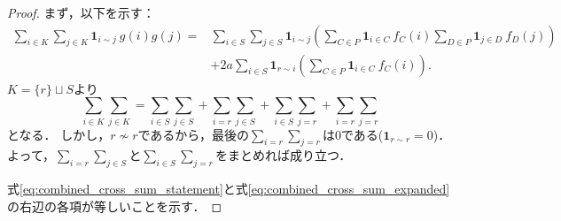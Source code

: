 \begin{proof}
  まず，以下を示す：
  \begin{equation} \label{eq:combined_cross_sum_expanded}
    \begin{split}
      \sum_{i \in K} \sum_{j \in K} \bm{1}_{i \sim j}\ g(i) g(j)
      = &\sum_{i \in S} \sum_{j \in S} \bm{1}_{i \sim j} \left( \sum_{C \in P} \bm{1}_{i \in C}\ f_C(i) \sum_{D \in P} \bm{1}_{j \in D}\ f_D(j) \right) \\
        &+ 2 a \sum_{i \in S} \bm{1}_{r \sim i} \left( \sum_{C \in P} \bm{1}_{i \in C}\ f_C(i) \right).
    \end{split}
  \end{equation}
  $K = \{r\} \sqcup S$より
  \begin{equation}
    \sum_{i \in K} \sum_{j \in K}
    = \sum_{i \in S} \sum_{j \in S} + \sum_{i = r} \sum_{j \in S} + \sum_{i \in S} \sum_{j = r} + \sum_{i = r} \sum_{j = r}
  \end{equation}
  となる．
  しかし，$r \not\sim r$であるから，最後の$\sum_{i = r} \sum_{j = r}$は$0$である($\bm{1}_{r \sim r} = 0$)．
  よって，$\sum_{i = r} \sum_{j \in S}$と$\sum_{i \in S} \sum_{j = r}$をまとめれば成り立つ．

  式\eqref{eq:combined_cross_sum_statement}と式\eqref{eq:combined_cross_sum_expanded}の右辺の各項が等しいことを示す．


\end{proof}
